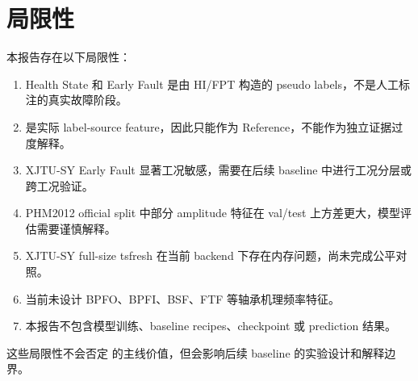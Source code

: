 \section{局限性}

本报告存在以下局限性：

\begin{enumerate}
  \item Health State 和 Early Fault 是由 HI/FPT 构造的 pseudo labels，不是人工标注的真实故障阶段。
  \item {} 是实际 label-source feature，因此只能作为 Reference，不能作为独立证据过度解释。
  \item XJTU-SY Early Fault 显著工况敏感，需要在后续 baseline 中进行工况分层或跨工况验证。
  \item PHM2012 official split 中部分 amplitude 特征在 val/test 上方差更大，模型评估需要谨慎解释。
  \item XJTU-SY full-size tsfresh 在当前 backend 下存在内存问题，尚未完成公平对照。
  \item 当前未设计 BPFO、BPFI、BSF、FTF 等轴承机理频率特征。
  \item 本报告不包含模型训练、baseline recipes、checkpoint 或 prediction 结果。
\end{enumerate}

这些局限性不会否定  的主线价值，但会影响后续 baseline 的实验设计和解释边界。
